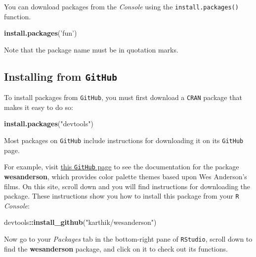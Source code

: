 \documentclass[
]{book}
\newenvironment{Shaded}{\begin{snugshade}}{\end{snugshade}}
\newcommand{\KeywordTok}[1]{\textcolor[rgb]{0.13,0.29,0.53}{\textbf{#1}}}
\newcommand{\NormalTok}[1]{#1}
\newcommand{\OperatorTok}[1]{\textcolor[rgb]{0.81,0.36,0.00}{\textbf{#1}}}
\newcommand{\StringTok}[1]{\textcolor[rgb]{0.31,0.60,0.02}{#1}}
\begin{document}
You can download packages from the \emph{Console} using the \texttt{install.packages()} function.

\begin{Shaded}
\begin{Highlighting}[]
\KeywordTok{install.packages}\NormalTok{(}\StringTok{'fun'}\NormalTok{)}
\end{Highlighting}
\end{Shaded}

Note that the package name must be in quotation marks.

\hypertarget{installing-from-github}{%
\subsection*{\texorpdfstring{Installing from \texttt{GitHub}}{Installing from GitHub}}\label{installing-from-github}}

To install packages from \texttt{GitHub}, you must first download a \texttt{CRAN} package that makes it easy to do so:

\begin{Shaded}
\begin{Highlighting}[]
\KeywordTok{install.packages}\NormalTok{(}\StringTok{"devtools"}\NormalTok{)}
\end{Highlighting}
\end{Shaded}

Most packages on \texttt{GitHub} include instructions for downloading it on its \texttt{GitHub} page.

For example, visit \href{https://github.com/karthik/wesanderson}{this \texttt{GitHub} page} to see the documentation for the package \textbf{wesanderson}, which provides color palette themes based upon Wes Anderson's films. On this site, scroll down and you will find instructions for downloading the package. These instructions show you how to install this package from your \texttt{R} \emph{Console}:

\begin{Shaded}
\begin{Highlighting}[]
\NormalTok{devtools}\OperatorTok{::}\KeywordTok{install_github}\NormalTok{(}\StringTok{"karthik/wesanderson"}\NormalTok{)}
\end{Highlighting}
\end{Shaded}

Now go to your \emph{Packages} tab in the bottom-right pane of \texttt{RStudio}, scroll down to find the \textbf{wesanderson} package, and click on it to check out its functions.
\end{document}
